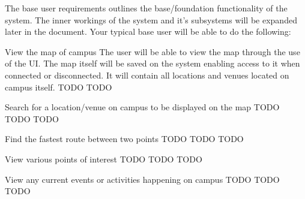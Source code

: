 The base user requirements outlines the base/foundation functionality of the system. The inner workings of the system and it's subsystems will be expanded later in the document. Your typical base user will be able to do the following:

\FuncReq
{View the map of campus}
{The user will be able to view the map through the use of the UI. The map itself will be saved on the system enabling access to it when connected or disconnected. It will contain all locations and venues located on campus itself.}
{TODO}
{TODO}

\FuncReq
{Search for a location/venue on campus to be displayed on the map}
{TODO}
{TODO}
{TODO}

\FuncReq
{Find the fastest route between two points}%
{TODO}
{TODO}
{TODO}

\FuncReq
{View various points of interest}
{TODO}
{TODO}
{TODO}

\FuncReq
{View any current events or activities happening on campus}
{TODO}
{TODO}
{TODO}